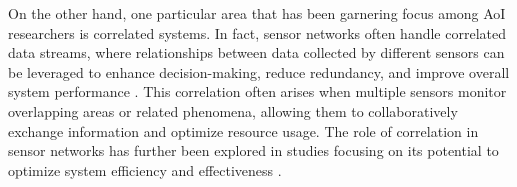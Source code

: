 On the other hand, one particular area that has been garnering focus among AoI researchers is correlated systems. In fact, sensor networks often handle correlated data streams, where relationships between data collected by different sensors can be leveraged to enhance decision-making, reduce redundancy, and improve overall system performance \cite{mahmood2015reliability,yetgin2017survey}. This correlation often arises when multiple sensors monitor overlapping areas or related phenomena, allowing them to collaboratively exchange information and optimize resource usage. The role of correlation in sensor networks has further been explored in studies focusing on its potential to optimize system efficiency and effectiveness \cite{he2018,tong2022,popovski2019,modiano2022,ramakanth2023monitoring,erbayat2024}.
















